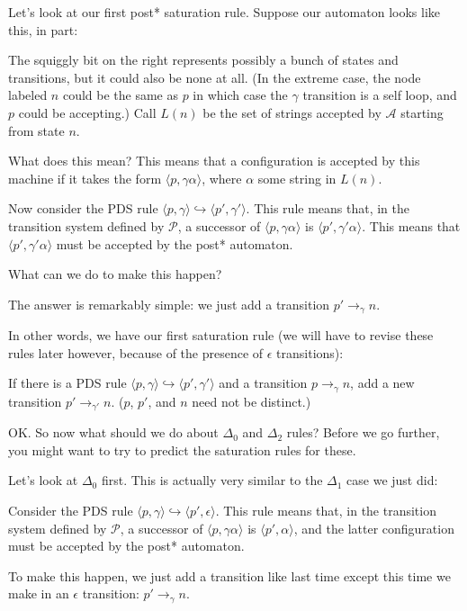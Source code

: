 \documentclass{article}
\newcommand{\Config}[2]{\ensuremath{\langle #1, #2 \rangle}}
\newcommand{\Rule}[2]{\ensuremath{#1 \hookrightarrow #2}}
\newcommand{\Trans}[3]{\ensuremath{#1 \rightarrow_{#2} #3}}
\begin{document}
Let's look at our first post* saturation rule. Suppose our automaton
looks like this, in part:



The squiggly bit on the right represents possibly a bunch of states
and transitions, but it could also be none at all. (In the extreme
case, the node labeled $n$ could be the same as $p$ in which case the
$\gamma$ transition is a self loop, and $p$ could be accepting.) Call
$L(n)$ be the set of strings accepted by $\mathcal{A}$ starting from
state $n$.

What does this mean? This means that a configuration is accepted by
this machine if it takes the form \Config{p}{\gamma\alpha}, where
$\alpha$ some string in $L(n)$.

Now consider the PDS rule
\Rule{\Config{p}{\gamma}}{\Config{p'}{\gamma'}}. This rule means that,
in the transition system defined by $\mathcal{P}$, a successor of
\Config{p}{\gamma\alpha} is \Config{p'}{\gamma'\alpha}. This means
that \Config{p'}{\gamma'\alpha} must be accepted by the post*
automaton.

What can we do to make this happen?

The answer is remarkably simple: we just add a transition
$\Trans{p'}{\gamma}{n}$.

In other words, we have our first saturation rule (we will have to
revise these rules later however, because of the presence of
$\epsilon$ transitions):

   If there is a PDS rule
   \Rule{\Config{p}{\gamma}}{\Config{p'}{\gamma'}} and a transition
   \Trans{p}{\gamma}{n}, add a new transition
   \Trans{p'}{\gamma'}{n}. ($p$, $p'$, and $n$ need not be distinct.)

OK. So now what should we do about $\Delta_0$ and $\Delta_2$ rules?
Before we go further, you might want to try to predict the saturation
rules for these.

Let's look at $\Delta_0$ first. This is actually very similar to the
$\Delta_1$ case we just did:

Consider the PDS rule
\Rule{\Config{p}{\gamma}}{\Config{p'}{\epsilon}}. This rule means that,
in the transition system defined by $\mathcal{P}$, a successor of
\Config{p}{\gamma\alpha} is \Config{p'}{\alpha}, and the latter
configuration must be accepted by the post* automaton.

To make this happen, we just add a transition like last time except
this time we make in an $\epsilon$ transition:
$\Trans{p'}{\gamma}{n}$.
\end{document}
